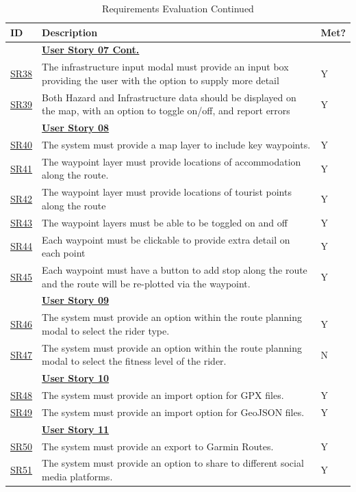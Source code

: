 \begin{table}[!htb]
    \ContinuedFloat
    \caption{Requirements Evaluation Continued}
    \label{evaluatedrqextended2}
    \small
    \begin{tabularx}{\textwidth}{ p{1cm} p{11cm} p{1cm} }
        \hline
        ID & Description & Met? \\ 
        \hline
        & \textbf{\hyperref[tab:user-story-07]{User Story 07 Cont.}}  \\
        \hyperref[SR:38]{SR38} & The infrastructure input modal must provide an input box providing the user with the option to supply more detail & Y\\
        \hyperref[SR:39]{SR39} & Both Hazard and Infrastructure data should be displayed on the map, with an option to toggle on/off, and report errors & Y\\
        \hline
        & \textbf{\hyperref[tab:user-story-08]{User Story 08}}  \\
        \hyperref[SR:40]{SR40} & The system must provide a map layer to include key waypoints. & Y \\
        \hyperref[SR:41]{SR41} & The waypoint layer must provide locations of accommodation along the route. & Y\\
        \hyperref[SR:42]{SR42} & The waypoint layer must provide locations of tourist points along the route & Y\\
        \hyperref[SR:43]{SR43} & The waypoint layers must be able to be toggled on and off & Y\\
        \hyperref[SR:44]{SR44} & Each waypoint must be clickable to provide extra detail on each point & Y\\
        \hyperref[SR:45]{SR45} & Each waypoint must have a button to add stop along the route and the route will be re-plotted via the waypoint. & Y\\
        \hline
        & \textbf{\hyperref[tab:user-story-09]{User Story 09}}  \\
        \hyperref[SR:46]{SR46} & The system must provide an option within the route planning modal to select the rider type. & Y\\
        \hyperref[SR:47]{SR47} & The system must provide an option within the route planning modal to select the fitness level of the rider. & N\\
        \hline
        & \textbf{\hyperref[tab:user-story-10]{User Story 10}}  \\
        \hyperref[SR:48]{SR48} & The system must provide an import option for GPX files. & Y\\
        \hyperref[SR:49]{SR49} & The system must provide an import option for GeoJSON files. & Y\\
        \hline
        & \textbf{\hyperref[tab:user-story-11]{User Story 11}} \\
        \hyperref[SR:50]{SR50} & The system must provide an export to Garmin Routes. & Y\\
        \hyperref[SR:51]{SR51} & The system must provide an option to share to different social media platforms. & Y\\
        \hline
    \end{tabularx}
\end{table}
\endgroup

